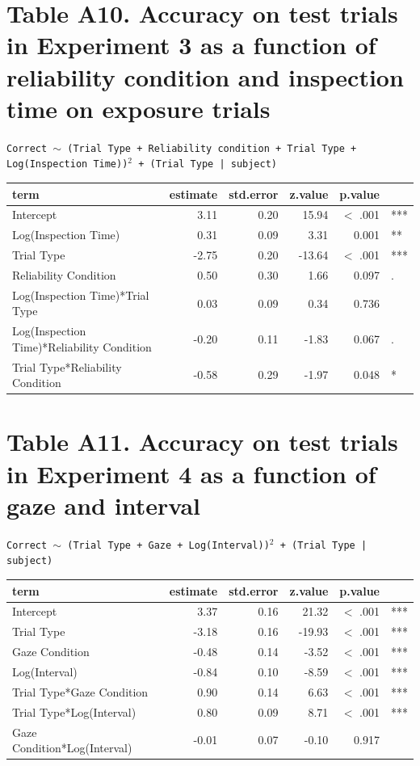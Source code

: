 \documentclass[authoryear, review]{elsarticle}
\begin{document}
\section*{Table A10. Accuracy on test trials in Experiment 3 as a function of reliability condition and inspection time on exposure trials}

\texttt{Correct $\sim$ (Trial Type + Reliability condition + Trial Type + \\ Log(Inspection Time))$^2$ + (Trial Type | subject)}

\begin{table}[h]
\centering
\begin{tabular}{lrrrrl}
 term & estimate & std.error & z.value & p.value &  \\ 
  \hline
Intercept & 3.11 & 0.20 & 15.94 & $<$ .001 & *** \\ 
  Log(Inspection Time) & 0.31 & 0.09 & 3.31 & 0.001 & ** \\ 
  Trial Type & -2.75 & 0.20 & -13.64 & $<$ .001 & *** \\ 
  Reliability Condition & 0.50 & 0.30 & 1.66 & 0.097 & . \\ 
  Log(Inspection Time)*Trial Type & 0.03 & 0.09 & 0.34 & 0.736 &  \\ 
  Log(Inspection Time)*Reliability Condition & -0.20 & 0.11 & -1.83 & 0.067 & . \\ 
  Trial Type*Reliability Condition & -0.58 & 0.29 & -1.97 & 0.048 & * \\ 
   \hline
\end{tabular}
\label{tab:e3_acc_inspect}
\end{table}

\newpage

\section*{Table A11. Accuracy on test trials in Experiment 4 as a function of gaze and interval}

\texttt{Correct $\sim$ (Trial Type + Gaze + Log(Interval))$^2$ + (Trial Type | subject)}

\begin{table}[h]
\centering
\begin{tabular}{lrrrrl}
 term & estimate & std.error & z.value & p.value &  \\ 
  \hline
Intercept & 3.37 & 0.16 & 21.32 & $<$ .001 & *** \\ 
  Trial Type & -3.18 & 0.16 & -19.93 & $<$ .001 & *** \\ 
  Gaze Condition & -0.48 & 0.14 & -3.52 & $<$ .001 & *** \\ 
  Log(Interval) & -0.84 & 0.10 & -8.59 & $<$ .001 & *** \\ 
  Trial Type*Gaze Condition & 0.90 & 0.14 & 6.63 & $<$ .001 & *** \\ 
  Trial Type*Log(Interval) & 0.80 & 0.09 & 8.71 & $<$ .001 & *** \\ 
  Gaze Condition*Log(Interval) & -0.01 & 0.07 & -0.10 & 0.917 &  \\ 
   \hline
\end{tabular}
\label{tab:e4_acc}
\end{table}
\end{document}
